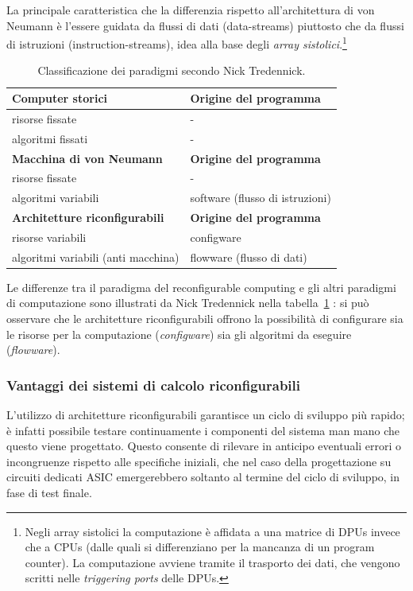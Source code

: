 La principale caratteristica che la differenzia rispetto all'architettura di von Neumann è
l'essere guidata da flussi di dati (data-streams) piuttosto che da flussi di istruzioni
(instruction-streams), idea alla base degli \emph{array sistolici}.\footnote{Negli array
sistolici la computazione è affidata a una matrice di \acp{DPU} invece che a \acsp{CPU}
(dalle quali si differenziano per la mancanza di un program counter). La computazione
avviene tramite il trasporto dei dati, che vengono scritti nelle \emph{triggering ports}
delle \acp{DPU}.}



\begin{table}[ht]
\begin{center}
 \begin{tabular}{l | l}
 \hline
 \textbf{Computer storici} & \textbf{Origine del programma}\\
 \hline
 risorse fissate & -\\
 algoritmi fissati & -\\
 \hline
 \textbf{Macchina di von Neumann} & \textbf{Origine del programma}\\
 \hline
 risorse fissate & -\\
 algoritmi variabili & software (flusso di istruzioni)\\
 \hline
 \textbf{Architetture riconfigurabili} & \textbf{Origine del programma}\\
 \hline
 risorse variabili & configware\\
 algoritmi variabili (anti macchina) & flowware (flusso di dati)
 \end{tabular}
 \caption{Classificazione dei paradigmi secondo Nick Tredennick.}
 \label{tab:TredennickClassificationScheme}
 \end{center}
\end{table}

Le differenze tra il paradigma del reconfigurable computing e gli altri paradigmi di
computazione sono illustrati da Nick Tredennick nella
tabella~\ref{tab:TredennickClassificationScheme} \cite{TredennickClassification}: si può
osservare che le architetture riconfigurabili offrono la possibilità di configurare sia le
risorse per la computazione (\emph{configware}) sia gli algoritmi da eseguire
(\emph{flowware}). 

\subsubsection{Vantaggi dei sistemi di calcolo riconfigurabili}
L'utilizzo di architetture riconfigurabili garantisce un ciclo di sviluppo pi\`u rapido;
\`e infatti possibile testare continuamente i componenti del sistema man mano che questo viene
progettato. Questo consente di rilevare in anticipo eventuali errori o incongruenze rispetto alle
specifiche iniziali, che nel caso della progettazione su circuiti dedicati \ac{ASIC} emergerebbero
soltanto al termine del ciclo di sviluppo, in fase di test finale.

